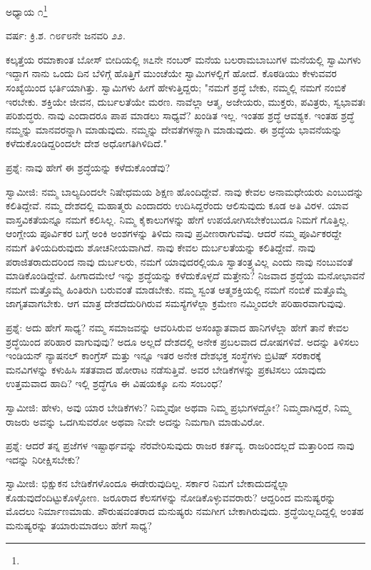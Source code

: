 
ಅಧ್ಯಾಯ ೧\protect\footnote{}

\begin{center}
ವರ್ಷ: ಕ್ರಿ.ಶ. ೧೮೯೮ನೇ ಜನವರಿ ೨೨.
\end{center}

ಕಲ್ಕತ್ತೆಯ ರಮಾಕಾಂತ ಬೋಸ್ ಬೀದಿಯಲ್ಲಿ ೫೭ನೇ ನಂಬರ್‌ ಮನೆಯ ಬಲರಾಮಬಾಬುಗಳ ಮನೆಯಲ್ಲಿ ಸ್ವಾಮಿಗಳು ಇದ್ದಾಗ ನಾನು ಒಂದು ದಿನ ಬೆಳಿಗ್ಗೆ ಹೊತ್ತಿಗೆ ಮುಂಚೆಯೇ ಸ್ವಾಮಿಗಳಲ್ಲಿಗೆ ಹೋದೆ. ಕೊಠಡಿಯು ಕೇಳುವವರ ಸಂಖ್ಯೆಯಿಂದ ಭರ್ತಿಯಾಗಿತ್ತು. ಸ್ವಾಮಿಗಳು ಹೀಗೆ ಹೇಳುತ್ತಿದ್ದರು; "ನಮಗೆ ಶ್ರದ್ಧೆ ಬೇಕು, ನಮ್ಮಲ್ಲಿ ನಮಗೆ ನಂಬಿಕೆ ಇರಬೇಕು. ಶಕ್ತಿಯೇ ಜೀವನ, ದುರ್ಬಲತೆಯೇ ಮರಣ. ನಾವೆಲ್ಲಾ ಆತ್ಮ, ಅಜೇಯರು, ಮುಕ್ತರು, ಪವಿತ್ರರು, ಸ್ವಭಾವತಃ ಪರಿಶುದ್ಧರು. ನಾವು ಎಂದಾದರೂ ಪಾಪ ಮಾಡಲು ಸಾಧ್ಯವೆ? ಖಂಡಿತ ಇಲ್ಲ. ಇಂತಹ ಶ್ರದ್ಧೆ ಆವಶ್ಯಕ. ಇಂತಹ ಶ್ರದ್ಧೆ ನಮ್ಮನ್ನು ಮಾನವರನ್ನಾಗಿ ಮಾಡುವುದು. ನಮ್ಮನ್ನು ದೇವತೆಗಳನ್ನಾಗಿ ಮಾಡುವುದು. ಈ ಶ್ರದ್ಧೆಯ ಭಾವನೆಯನ್ನು ಕಳೆದುಕೊಂಡಿದ್ದರಿಂದಲೇ ದೇಶ ಅಧೋಗತಿಗಿಳಿದಿದೆ."

ಪ್ರಶ್ನೆ: ನಾವು ಹೇಗೆ ಈ ಶ್ರದ್ಧೆಯನ್ನು ಕಳೆದುಕೊಂಡೆವು?

ಸ್ವಾಮೀಜಿ: ನಮ್ಮ ಬಾಲ್ಯದಿಂದಲೇ ನಿಷೇಧಮಯ ಶಿಕ್ಷಣ ಹೊಂದಿದ್ದೇವೆ. ನಾವು ಕೇವಲ ಅನಾಮಧೇಯರು ಎಂಬುದನ್ನು ಕಲಿತಿದ್ದೇವೆ. ನಮ್ಮ ದೇಶದಲ್ಲಿ ಮಹಾತ್ಮರು ಎಂದಾದರು ಉದಿಸಿದ್ದರೆಂದು ಆಲಿಸುವುದು ಕೂಡ ಅತಿ ವಿರಳ. ಯಾವ ವಾಸ್ತವಿಕತೆಯನ್ನೂ ನಮಗೆ ಕಲಿಸಿಲ್ಲ. ನಿಮ್ಮ ಕೈಕಾಲುಗಳನ್ನು ಹೇಗೆ ಉಪಯೋಗಿಸಬೇಕೆಂಬುದೂ ನಿಮಗೆ ಗೊತ್ತಿಲ್ಲ. ಆಂಗ್ಲೇಯ ಪೂರ್ವಿಕರ ಬಗ್ಗೆ ಅಂಕಿ ಅಂಶಗಳನ್ನು ತಿಳಿದು ನಾವು ಪ್ರವೀಣರಾಗುವೆವು. ಆದರೆ ನಮ್ಮ ಪೂರ್ವಿಕರದ್ದೇ ನಮಗೆ ತಿಳಿಯದಿರುವುದು ಶೋಚನೀಯವಾಗಿದೆ. ನಾವು ಕೇವಲ ದುರ್ಬಲತೆಯನ್ನು ಕಲಿತಿದ್ದೇವೆ. ನಾವು ಪರಾಜಿತರಾದುದರಿಂದ ನಾವು ದುರ್ಬಲರು, ನಮಗೆ ಯಾವುದರಲ್ಲಿಯೂ ಸ್ವಾತಂತ್ರ್ಯವಿಲ್ಲ ಎಂದು ನಾವು ನಂಬುವಂತೆ ಮಾಡಿಕೊಂಡಿದ್ದೇವೆ. ಹೀಗಾದಮೇಲೆ ಇನ್ನು ಶ್ರದ್ಧೆಯನ್ನು ಕಳೆದುಕೊಳ್ಳದೆ ಮತ್ತೇನು? ನಿಜವಾದ ಶ್ರದ್ಧೆಯ ಮನೋಭಾವನೆ ನಮಗೆ ಮತ್ತೊಮ್ಮೆ ಹಿಂತಿರುಗಿ ಬರುವಂತೆ ಮಾಡಬೇಕು. ನಮ್ಮ ಸ್ವಂತ ಆತ್ಮಶಕ್ತಿಯಲ್ಲಿ ನಮಗೆ ನಂಬಿಕೆ ಮತ್ತೊಮ್ಮೆ ಜಾಗೃತವಾಗಬೇಕು. ಆಗ ಮಾತ್ರ ದೇಶದೆದುರಿಗಿರುವ ಸಮಸ್ಯೆಗಳೆಲ್ಲಾ ಕ್ರಮೇಣ ನಮ್ಮಿಂದಲೇ ಪರಿಹಾರವಾಗುವುವು.

ಪ್ರಶ್ನೆ: ಅದು ಹೇಗೆ ಸಾಧ್ಯ? ನಮ್ಮ ಸಮಾಜವನ್ನು ಆವರಿಸಿರುವ ಅಸಂಖ್ಯಾತವಾದ ಹಾನಿಗಳೆಲ್ಲಾ ಹೇಗೆ ತಾನೆ ಕೇವಲ ಶ್ರದ್ಧೆಯಿಂದ ಪರಿಹಾರ ವಾಗುವುವು? ಅದೂ ಅಲ್ಲದೆ ದೇಶದಲ್ಲಿ ಅನೇಕ ಪ್ರಬಲವಾದ ದೋಷಗಳಿವೆ. ಅದನ್ನು ತಿಳಿಸಲು ಇಂಡಿಯನ್ ನ್ಯಾಷನಲ್ ಕಾಂಗ್ರೆಸ್ ಮತ್ತು ಇನ್ನೂ ಇತರ ಅನೇಕ ದೇಶಭಕ್ತ ಸಂಸ್ಥೆಗಳು ಬ್ರಿಟಿಷ್ ಸರಕಾರಕ್ಕೆ ಮನವಿಗಳನ್ನು ಕಳುಹಿಸಿ ಸತತವಾದ ಹೋರಾಟ ನಡೆಸುತ್ತಿವೆ. ಅವರ ಬೇಡಿಕೆಗಳನ್ನು ಪ್ರಕಟಿಸಲು ಯಾವುದು ಉತ್ತಮವಾದ ಹಾದಿ? ಇಲ್ಲಿ ಶ್ರದ್ಧೆಗೂ ಈ ವಿಷಯಕ್ಕೂ ಏನು ಸಂಬಂಧ?

ಸ್ವಾಮೀಜಿ: ಹೇಳು, ಅವು ಯಾರ ಬೇಡಿಕೆಗಳು? ನಿಮ್ಮವೋ ಅಥವಾ ನಿಮ್ಮ ಪ್ರಭುಗಳದ್ದೋ? ನಿಮ್ಮದಾಗಿದ್ದರೆ, ನಿಮ್ಮ ರಾಜರು ಅವನ್ನು ಒದಗಿಸುವರೋ ಅಥವಾ ನೀವೇ ಅದನ್ನು ನಿಮಗಾಗಿ ಮಾಡುವಿರೋ.

ಪ್ರಶ್ನೆ: ಆದರೆ ತನ್ನ ಪ್ರಜೆಗಳ ಇಷ್ಟಾರ್ಥವನ್ನು ನೆರವೇರಿಸುವುದು ರಾಜರ ಕರ್ತವ್ಯ. ರಾಜರಿಂದಲ್ಲದೆ ಮತ್ತಾರಿಂದ ನಾವು ಇದನ್ನು ನಿರೀಕ್ಷಿಸಬೇಕು?

ಸ್ವಾಮೀಜಿ: ಭಿಕ್ಷುಕನ ಬೇಡಿಕೆಗಳೊಂದೂ ಈಡೇರುವುದಿಲ್ಲ. ಸರ್ಕಾರ ನಿಮಗೆ ಬೇಕಾದುದನ್ನೆಲ್ಲಾ ಕೊಡುವುದೆಂದಿಟ್ಟುಕೊಳ್ಳೋಣ. ಜರೂರಾದ ಕೆಲಸಗಳನ್ನು ನೋಡಿಕೊಳ್ಳುವವರಾರು? ಆದ್ದರಿಂದ ಮನುಷ್ಯರನ್ನು ಮೊದಲು ನಿರ್ಮಾಣಮಾಡು. ಪೌರುಷವಂತರಾದ ಮನುಷ್ಯರು ನಮಗೀಗ ಬೇಕಾಗಿರುವುದು. ಶ್ರದ್ಧೆಯಿಲ್ಲದಿದ್ದಲ್ಲಿ ಅಂತಹ ಮನುಷ್ಯರನ್ನು ತಯಾರುಮಾಡಲು ಹೇಗೆ ಸಾಧ್ಯ?

